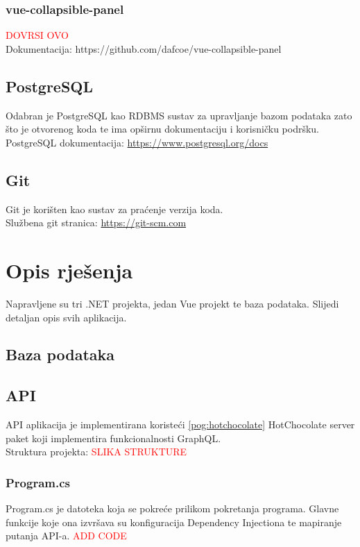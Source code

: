 \documentclass[zavrsnirad]{fer}
\begin{document}
\subsection{vue-collapsible-panel}
\label{pog:vue_collapsible_panel}
\textcolor{red}{DOVRSI OVO}
\\Dokumentacija: https://github.com/dafcoe/vue-collapsible-panel

\section{PostgreSQL}
Odabran je PostgreSQL kao RDBMS sustav za upravljanje bazom podataka zato što je otvorenog koda te ima opširnu dokumentaciju i korisničku podršku.
\\PostgreSQL dokumentacija: \url{https://www.postgresql.org/docs}

\section{Git}
Git je korišten kao sustav za praćenje verzija koda.
\\Službena git stranica: \url{https://git-scm.com}


\chapter{Opis rješenja}
\label{pog:opis_rjesenja}
Napravljene su tri .NET projekta, jedan Vue projekt te baza podataka. Slijedi detaljan opis svih aplikacija.

\section{Baza podataka}

\section{API}
API aplikacija je implementirana koristeći \ref{pog:hotchocolate} HotChocolate server paket koji implementira funkcionalnosti GraphQL.
\\Struktura projekta:
\textcolor{red}{SLIKA STRUKTURE}

\subsection{Program.cs}
Program.cs je datoteka koja se pokreće prilikom pokretanja programa. Glavne funkcije koje ona izvršava su konfiguracija Dependency Injectiona te mapiranje putanja API-a.
\textcolor{red}{ADD CODE}
\end{document}
